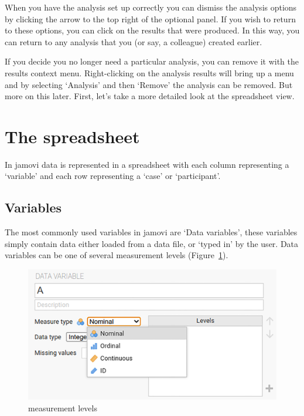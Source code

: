\documentclass[
  a4paper,
]{book}
\begin{document}
When you have the analysis set up correctly you can dismiss the analysis
options by clicking the arrow to the top right of the optional panel. If
you wish to return to these options, you can click on the results that
were produced. In this way, you can return to any analysis that you (or
say, a colleague) created earlier.

If you decide you no longer need a particular analysis, you can remove
it with the results context menu. Right-clicking on the analysis results
will bring up a menu and by selecting `Analysis' and then `Remove' the
analysis can be removed. But more on this later. First, let's take a
more detailed look at the spreadsheet view.

\hypertarget{the-spreadsheet}{%
\section{The spreadsheet}\label{the-spreadsheet}}

In jamovi data is represented in a spreadsheet with each column
representing a `variable' and each row representing a `case' or
`participant'.

\hypertarget{variables}{%
\subsection{Variables}\label{variables}}

The most commonly used variables in jamovi are `Data variables', these
variables simply contain data either loaded from a data file, or `typed
in' by the user. Data variables can be one of several measurement levels
(Figure~\ref{fig-fig3-2}).

\begin{figure}

\includegraphics[width=1\textwidth,height=\textheight]{images/fig3-2.png} \hfill{}

\caption{\label{fig-fig3-2}measurement levels}

\end{figure}
\end{document}
